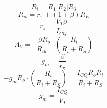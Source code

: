 %
\begin{equation}
  \label{eq:Ri}
  R_i = R_1 | R_2 | R_3
\end{equation}
%
\begin{equation}
  \label{eq:Rib}
  R_{ib} = r_\pi + (1+\beta) R_E
\end{equation}
%
\begin{equation}
  \label{eq:rpi}
  r_\pi = \frac{V_T\beta}{I_{CQ}}
\end{equation}
%
\begin{equation}
  \label{eq:Av1}
  A_V = \frac{-\beta R_o}{R_{ib}} \cdot \left( \frac{R_i}{R_i + R_S} \right)
\end{equation}
%
\begin{equation}
  \label{eq:gm1}
  g_m = \frac{\beta}{r_\pi}
\end{equation}
%
\begin{equation}
  \label{eq:Av2}
  -g_mR_o \cdot \left(\frac{R_i}{R_i + R_S} \right) = \frac{I_{CQ}R_oR_i}{R_i + R_S}
\end{equation}
%
\begin{equation}
  \label{eq:gm2}
  g_m = \frac{I_{CQ}}{V_T}
\end{equation}


